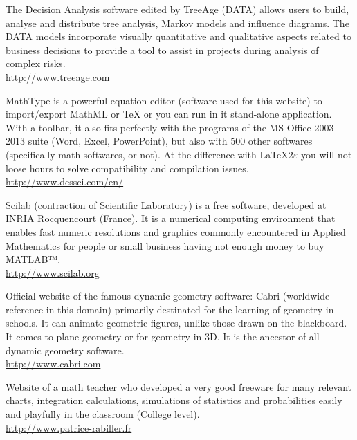 	{\Large {}}{\Large {}}{\Large {}}{\Large {}} The Decision Analysis software edited by TreeAge (DATA) allows users to build, analyse and distribute tree analysis, Markov models and influence diagrams. The DATA models incorporate visually quantitative and qualitative aspects related to business decisions to provide a tool to assist in projects during analysis of complex risks.\\
	\href{http://www.treeage.com}{\color{blue}http://www.treeage.com}
	
	{\Large {}}{\Large {}}{\Large {}}{\Large {}} MathType is a powerful equation editor (software used for this website) to import/export MathML or TeX or you can run in it stand-alone application. With a toolbar, it also fits perfectly with the programs of the MS Office 2003-2013 suite (Word, Excel, PowerPoint), but also with 500 other softwares (specifically math softwares, or not). At the difference with \LaTeX 2$\varepsilon$ you will not loose hours to solve compatibility and compilation issues.\\ 
	\href{http://www.dessci.com/en/}{\color{blue}http://www.dessci.com/en/}
	
	{\Large {}}{\Large {}}{\Large {}} Scilab (contraction of Scientific Laboratory) is a free software, developed at INRIA Rocquencourt (France). It is a numerical computing environment that enables fast numeric resolutions and graphics commonly encountered in Applied Mathematics for people or small business having not enough money to buy MATLAB™.\\
	\href{http://www.scilab.org}{\color{blue}http://www.scilab.org}
	
	{\Large {}}{\Large {}} Official website of the famous dynamic geometry software: Cabri (worldwide reference in this domain) primarily destinated for the learning of geometry in schools. It can animate geometric figures, unlike those drawn on the blackboard. It comes to plane geometry or for geometry in 3D. It is the ancestor of all dynamic geometry software.\\
	\href{http://www.cabri.com}{\color{blue}http://www.cabri.com}
	
	{\Large {}}{\Large {}}{\Large {}}\bcdfrance{} Website of a math teacher who developed a very good freeware for many relevant charts, integration calculations, simulations of statistics and probabilities easily and playfully in the classroom (College level).\\
	\href{http://www.patrice-rabiller.fr}{\color{blue}http://www.patrice-rabiller.fr}
	
